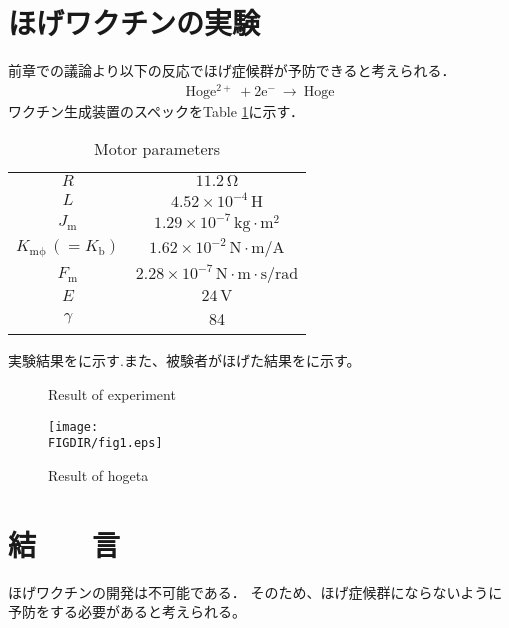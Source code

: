 \begin{small}
\section{ほげワクチンの実験}
前章での議論より以下の反応でほげ症候群が予防できると考えられる．
\begin{eqnarray}
\mathrm{Hoge^{2+} \ + 2e^{-} \ \rightarrow \ Hoge}
\end{eqnarray}
ワクチン生成装置のスペックをTable \ref{spec}に示す．
\begin{table}[b]
\caption{Motor parameters}
\label{spec}
\begin{center}
\begin{tabular}{c c}
\toprule
$R$ & $11.2\,\mathrm{\Omega}$ \\
$L$ & $4.52 \times 10^{-4}\,\mathrm{H}$ \\
$J_\mathrm{m}$ & $1.29 \times 10^{-7}\,\mathrm{kg \cdot m^2}$ \\
$K_\mathrm{m\phi}\,(=K_\mathrm{b})$ & $1.62 \times 10^{-2}\,\mathrm{N \cdot m / A}$ \\
$F_\mathrm{m}$ & $2.28 \times 10^{-7}\,\mathrm{N \cdot m \cdot s / rad}$ \\
$E$ & $24\,\mathrm{V}$ \\
$\gamma$ & 84 \\
\bottomrule
\end{tabular}
\end{center}
\end{table}
実験結果をに示す.また、被験者がほげた結果をに示す。

\begin{figure}[b]
\begin{center}
\caption{Result of experiment}
\end{center}
\end{figure}

\begin{figure}[b]
\begin{center}
\texttt{[image: \\FIGDIR/fig1.eps]}%
\caption{Result of hogeta}
\end{center}
\end{figure}
\section{結　　言}
ほげワクチンの開発は不可能である．
そのため、ほげ症候群にならないように予防をする必要があると考えられる。





\end{small}

